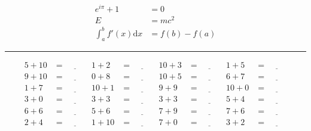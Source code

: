 \documentclass{article}
\begin{document}
\begin{sloppy}
\begin{huge}
    \begin{align*}
        e^{i\pi} + 1 &= 0 \\
        E &= mc^2 \\
        \int_{a}^{b}f'(x)\mathrm{d}x &= f(b) - f(a)
    \end{align*}
\end{huge}
\hrule
\begin{align*}
    5 + 10 &= \underline{\hspace{1cm}} & 1 + 2 &= \underline{\hspace{1cm}} & 10 + 3 &= \underline{\hspace{1cm}} & 1 + 5 &= \underline{\hspace{1cm}} \\
    9 + 10 &= \underline{\hspace{1cm}} & 0 + 8 &= \underline{\hspace{1cm}} & 10 + 5 &= \underline{\hspace{1cm}} & 6 + 7 &= \underline{\hspace{1cm}} \\
    1 + 7 &= \underline{\hspace{1cm}} & 10 + 1 &= \underline{\hspace{1cm}} & 9 + 9 &= \underline{\hspace{1cm}} & 10 + 0 &= \underline{\hspace{1cm}} \\
    3 + 0 &= \underline{\hspace{1cm}} & 3 + 3 &= \underline{\hspace{1cm}} & 3 + 3 &= \underline{\hspace{1cm}} & 5 + 4 &= \underline{\hspace{1cm}} \\
    6 + 6 &= \underline{\hspace{1cm}} & 5 + 6 &= \underline{\hspace{1cm}} & 7 + 9 &= \underline{\hspace{1cm}} & 7 + 6 &= \underline{\hspace{1cm}} \\
    2 + 4 &= \underline{\hspace{1cm}} & 1 + 10 &= \underline{\hspace{1cm}} & 7 + 0 &= \underline{\hspace{1cm}} & 3 + 2 &= \underline{\hspace{1cm}} \\

\end{align*}
\end{sloppy}
\end{document}
